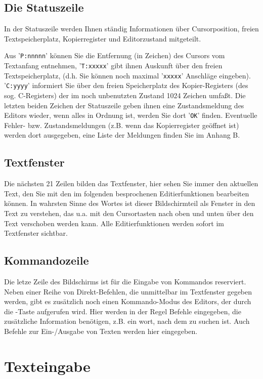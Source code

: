 \documentclass[10pt,a4paper,twoside,final,openright,titlepage]{memoir}
\newcommand{\key}[1]{\keystroke{\tiny #1}}
\begin{document}
\subsection{Die Statuszeile}

In der Statuszeile werden Ihnen ständig Informationen
über Cursorposition, freien Textspeicherplatz,
Kopierregister und Editorzustand mitgeteilt.

Aus '\texttt{P:nnnnn}' können Sie die Entfernung (in Zeichen)
des Cursors vom Textanfang entnehmen, '\texttt{T:xxxxx}' gibt
ihnen Auskunft über den freien Text\-spei\-cher\-platz,
(d.h. Sie können noch maximal '\texttt{xxxxx}' Anschläge
eingeben). '\texttt{C:yyyy}' informiert Sie über den freien
Speicherplatz des Kopier-Registers (des sog.
C-Registers) der im noch unbenutzten Zustand 1024
Zeichen umfaßt. Die letzten beiden Zeichen der
Statuszeile geben ihnen eine Zustandsmeldung des
Editors wieder, wenn alles in Ordnung ist, werden Sie
dort '\texttt{OK}' finden. Eventuelle Fehler- bzw. Zustandsmeldungen
(z.B. wenn das Kopierregister geöffnet ist)
werden dort ausgegeben, eine Liste der Meldungen
finden Sie im Anhang B.

\subsection{Textfenster}

Die nächsten 21 Zeilen bilden das Textfenster, hier
sehen Sie immer den aktuellen Text, den Sie mit den im
folgenden besprochenen Editierfunktionen bearbeiten
können. In wahrsten Sinne des Wortes ist dieser Bildschirmteil
als Fenster in den Text zu verstehen, das
u.a. mit den Cursortasten nach oben und unten über den
Text verschoben werden kann. Alle Editierfunktionen
werden sofort im Textfenster sichtbar.

\subsection{Kommandozeile}

Die letze Zeile des Bildschirms ist für die Eingabe
von Kommandos reserviert. Neben einer Reihe von
Direkt-Befehlen, die unmittelbar im Textfenster
gegeben werden, gibt es zusätzlich noch einen
Kommando-Modus des Editors, der durch die \key{ESC}-Taste
aufgerufen wird. Hier werden in der Regel Befehle
eingegeben, die zusätzliche Information benötigen, z.B.
ein wort, nach dem zu suchen ist. Auch Befehle zur
Ein-/Ausgabe von Texten werden hier eingegeben.

\section{Texteingabe}
\end{document}
